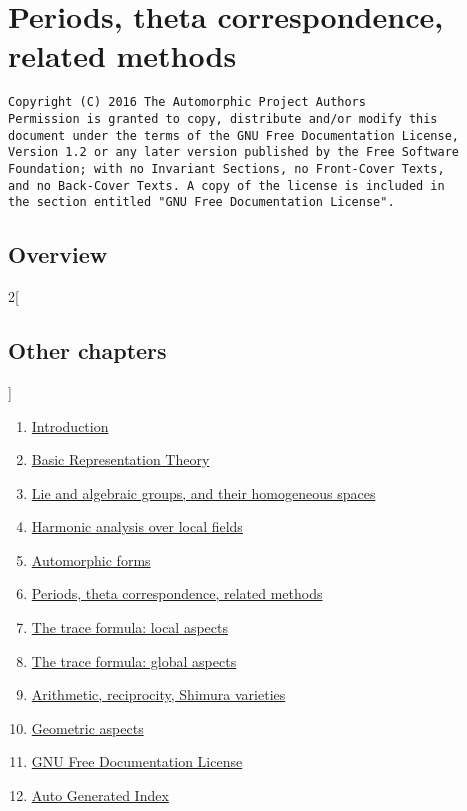 \documentclass{stacks-project-book}
\theoremstyle{plain}
\theoremstyle{definition}
\theoremstyle{remark}
\numberwithin{equation}{subsection}
\begin{document}
%

\chapter{Periods, theta correspondence, related methods}



\label{periods-section-phantom}

\begin{verbatim}
Copyright (C) 2016 The Automorphic Project Authors
Permission is granted to copy, distribute and/or modify this
document under the terms of the GNU Free Documentation License,
Version 1.2 or any later version published by the Free Software
Foundation; with no Invariant Sections, no Front-Cover Texts,
and no Back-Cover Texts. A copy of the license is included in
the section entitled "GNU Free Documentation License".
\end{verbatim}



\section{Overview}
\label{periods-section-overview}




\begin{multicols}{2}[\section{Other chapters}]
\noindent
\begin{enumerate}
\item \hyperref[introduction-section-phantom]{Introduction}
\item \hyperref[representationtheory-section-phantom]{Basic Representation Theory}
\item \hyperref[algebraicgroups-section-phantom]{Lie and algebraic groups, and their homogeneous spaces}
\item \hyperref[harmonicanalysis-section-phantom]{Harmonic analysis over local fields}
\item \hyperref[automorphicforms-section-phantom]{Automorphic forms}
\item \hyperref[periods-section-phantom]{Periods, theta correspondence, related methods}
\item \hyperref[traceformulalocal-section-phantom]{The trace formula: local aspects}
\item \hyperref[traceformulaglobal-section-phantom]{The trace formula: global aspects}
\item \hyperref[arithmetic-section-phantom]{Arithmetic, reciprocity, Shimura varieties}
\item \hyperref[geometric-section-phantom]{Geometric aspects}
\item \hyperref[fdl-section-phantom]{GNU Free Documentation License}
\item \hyperref[index-section-phantom]{Auto Generated Index}
\end{enumerate}
\end{multicols}
\end{document}
